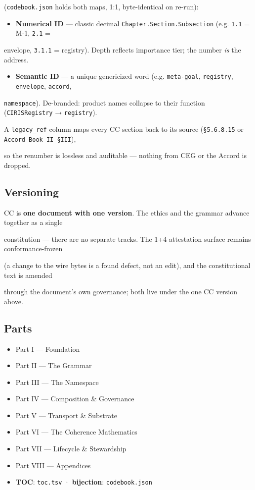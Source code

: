 \documentclass[11pt]{article}
\begin{document}
(\texttt{codebook.json} holds both maps, 1:1, byte-identical on re-run):


\begin{itemize}\setlength\itemsep{0pt}
\item \textbf{Numerical ID} — classic decimal \texttt{Chapter.Section.Subsection} (e.g. \texttt{1.1} = M-1, \texttt{2.1} =
\end{itemize}

  envelope, \texttt{3.1.1} = registry). Depth reflects importance tier; the number \textit{is} the address.

\begin{itemize}\setlength\itemsep{0pt}
\item \textbf{Semantic ID} — a unique genericized word (e.g. \texttt{meta-goal}, \texttt{registry}, \texttt{envelope}, \texttt{accord},
\end{itemize}

  \texttt{namespace}). De-branded: product names collapse to their function (\texttt{CIRISRegistry} → \texttt{registry}).


A \texttt{legacy\_ref} column maps every CC section back to its source (\texttt{§5.6.8.15} or \texttt{Accord Book II §III}),

so the renumber is lossless and auditable — nothing from CEG or the Accord is dropped.


\subsection*{Versioning}


CC is \textbf{one document with one version}. The ethics and the grammar advance together as a single

constitution — there are no separate tracks. The 1+4 attestation surface remains conformance-frozen

(a change to the wire bytes is a found defect, not an edit), and the constitutional text is amended

through the document's own governance; both live under the one CC version above.


\subsection*{Parts}


\begin{itemize}\setlength\itemsep{0pt}
\item Part I — Foundation
\item Part II — The Grammar
\item Part III — The Namespace
\item Part IV — Composition \& Governance
\item Part V — Transport \& Substrate
\item Part VI — The Coherence Mathematics
\item Part VII — Lifecycle \& Stewardship
\item Part VIII — Appendices
\item \textbf{TOC}: \texttt{toc.tsv} · \textbf{bijection}: \texttt{codebook.json}
\end{itemize}
\end{document}
